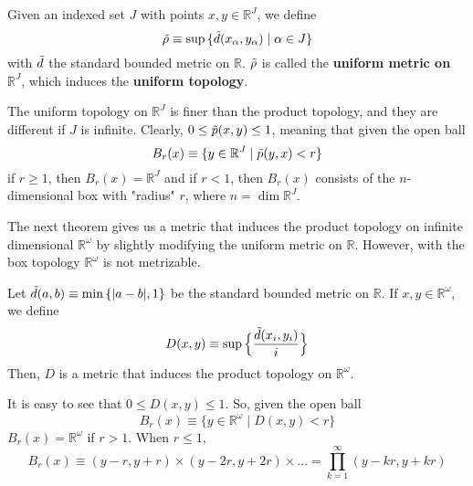  \begin{definition}
    Given an indexed set $J$ with points $x, y \in \mathbb{R}^J$, we define
    \begin{equation}
      \Tilde{\rho} \equiv \sup{\{\Tilde{d}(x_\alpha, y_\alpha)\;|\; \alpha \in J\}}
    \end{equation}
    with $\Tilde{d}$ the standard bounded metric on $\mathbb{R}$. $\Tilde{\rho}$ is called the \textbf{uniform metric on $\mathbb{R}^J$}, which induces the \textbf{uniform topology}. 
  \end{definition}

  The uniform topology on $\mathbb{R}^J$ is finer than the product topology, and they are different if $J$ is infinite. Clearly, $0 \leq \Tilde{p} (x, y) \leq 1$, meaning that given the open ball
  \begin{equation}
    B_r (x) \equiv \{y \in \mathbb{R}^J \;|\; \Tilde{p}(y, x) < r\}
  \end{equation}
  if $r \geq 1$, then $B_r (x) = \mathbb{R}^J$ and if $r<1$, then $B_r (x)$ consists of the $n$-dimensional box with "radius" $r$, where $n = \dim{\mathbb{R}^J}$. 


  The next theorem gives us a metric that induces the product topology on infinite dimensional $\mathbb{R}^\omega$ by slightly modifying the uniform metric on $\mathbb{R}$. However, with the box topology $\mathbb{R}^\omega$ is not metrizable. 

  \begin{theorem}
    Let $\Tilde{d} (a, b) \equiv \min{\{|a-b|, 1\}}$ be the standard bounded metric on $\mathbb{R}$. If $x, y \in \mathbb{R}^\omega$, we define
    \begin{equation}
      D(x, y) \equiv \sup{\Big\{ \frac{\Tilde{d}(x_i, y_i)}{i}\Big\}}
    \end{equation}
    Then, $D$ is a metric that induces the product topology on $\mathbb{R}^\omega$. 
  \end{theorem}
  
  It is easy to see that $0 \leq D(x, y) \leq 1$. So, given the open ball
  \begin{equation}
    B_r (x) \equiv \{y \in \mathbb{R}^\omega \; | \; D(x, y) < r\}
  \end{equation}
  $B_r (x) = \mathbb{R}^\omega$ if $r > 1$. When $r \leq 1$, 
  \begin{equation}
    B_r (x) \equiv (y-r, y+r) \times (y-2r, y+2r) \times ... = \prod_{k=1}^\infty (y - k r , y + k r)
  \end{equation}

